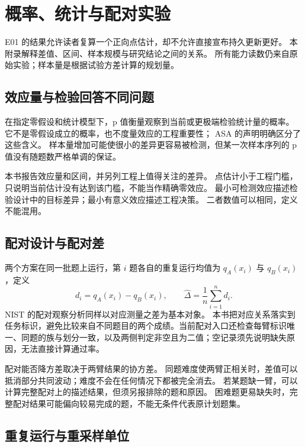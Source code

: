 \chapter{概率、统计与配对实验}
\label{app:stats}

E01 的结果允许读者复算一个正向点估计，却不允许直接宣布持久更新更好。
本附录解释差值、区间、样本规模与研究结论之间的关系。
所有能力读数仍来自原始实验；样本量是根据试验方差计算的规划量。

\section{效应量与检验回答不同问题}

在指定零假设和统计模型下，p 值衡量观察到当前或更极端检验统计量的概率。
它不是零假设成立的概率，也不度量效应的工程重要性；
ASA 的声明明确区分了这些含义\cite{asa-p-values}。
样本量增加可能使很小的差异更容易被检测，但某一次样本序列的 p 值没有随题数严格单调的保证。

本书报告效应量和区间，并另列工程上值得关注的差异。
点估计小于工程门槛，只说明当前估计没有达到该门槛，不能当作精确零效应。
最小可检测效应描述检验设计中的目标差异；最小有意义效应描述工程决策。
二者数值可以相同，定义不能混用。

\section{配对设计与配对差}

两个方案在同一批题上运行，第 $i$ 题各自的重复运行均值为 $q_A(x_i)$ 与 $q_B(x_i)$，定义
\begin{equation}
 d_i=q_A(x_i)-q_B(x_i),\qquad
 \widehat\Delta=\frac1n\sum_{i=1}^{n}d_i.
 \label{eq:paired}
\end{equation}
NIST 的配对观察分析同样以对应测量之差为基本对象\cite{nist-paired}。
本书把对应关系落实到任务标识，避免比较来自不同题目的两个成绩。当前配对入口还检查每臂标识唯一、同题的族与划分一致，以及两侧判定非空且为二值；空记录须先说明缺失原因，无法直接计算通过率。

配对能否降方差取决于两臂结果的协方差。
同题难度使两臂正相关时，差值可以抵消部分共同波动；难度不会在任何情况下都被完全消去。
若某题缺一臂，可以计算完整配对上的描述结果，但须另报排除的题和原因。
困难题更易缺失时，完整配对结果可能偏向较易完成的题，不能无条件代表原计划题集。

\section{重复运行与重采样单位}

